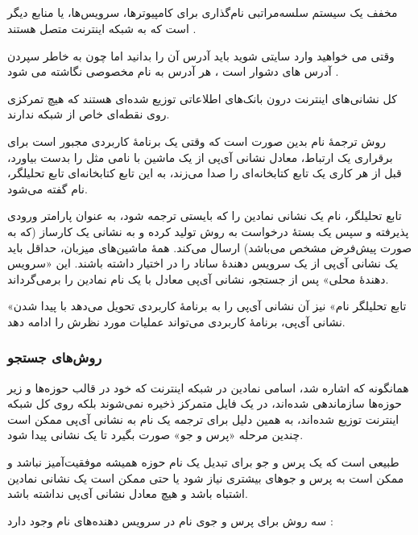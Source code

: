 \documentclass[12pt]{book}
\begin{document}
\subsection{}

مخفف
یک سیستم سلسه‌مراتبی نام‌گذاری برای کامپیوترها، سرویس‌ها، یا منابع دیگر است که به شبکه اینترنت متصل هستند .

وقتی می خواهید وارد سایتی شوید باید آدرس 
آن را بدانید اما چون به خاطر سپردن آدرس های 
دشوار است ، هر آدرس 
به نام مخصوصی نگاشته می شود .

کل نشانی‌های اینترنت درون بانک‌های اطلاعاتی توزیع شده‌ای هستند که هیچ تمرکزی روی نقطه‌ای خاص از شبکه ندارند. 

روش ترجمهٔ نام بدین صورت است که وقتی یک برنامهٔ کاربردی مجبور است برای برقراری یک ارتباط، معادل نشانی آی‌پی از یک ماشین با نامی مثل
 را بدست بیاورد، قبل از هر کاری یک تابع کتابخانه‌ای را صدا می‌زند، به این تابع کتابخانه‌ای تابع تحلیلگر، نام 
 گفته می‌شود. 
 
 تابع تحلیلگر، نام یک نشانی نمادین را که بایستی ترجمه شود، به عنوان پارامتر ورودی پذیرفته و سپس یک بستهٔ درخواست
  به روش
   تولید کرده و به نشانی یک کارساز
   (که به صورت پیش‌فرض مشخص می‌باشد) ارسال می‌کند. همهٔ ماشین‌های میزبان، حداقل باید یک نشانی آی‌پی از یک سرویس دهندهٔ ساناد را در اختیار داشته باشند. این «سرویس دهندهٔ محلی» پس از جستجو، نشانی آی‌پی معادل با یک نام نمادین را برمی‌گرداند.
   
«تابع تحلیلگر نام» نیز آن نشانی آی‌پی را به برنامهٔ کاربردی تحویل می‌دهد با پیدا شدن نشانی آی‌پی، برنامهٔ کاربردی می‌تواند عملیات مورد نظرش را ادامه دهد. 

\subsubsection{روش‌های جستجو}

همانگونه که اشاره شد، اسامی نمادین در شبکه اینترنت که خود در قالب حوزه‌ها و زیر حوزه‌ها سازماندهی شده‌اند، در یک فایل متمرکز ذخیره نمی‌شوند بلکه روی کل شبکه اینترنت توزیع شده‌اند، به همین دلیل برای ترجمه یک نام به نشانی آی‌پی ممکن است چندین مرحله «پرس و جو» صورت بگیرد تا یک نشانی پیدا شود.

طبیعی است که یک پرس و جو برای تبدیل یک نام حوزه همیشه موفقیت‌آمیز نباشد و ممکن است به پرس و جوهای بیشتری نیاز شود یا حتی ممکن است یک نشانی نمادین اشتباه باشد و هیچ معادل نشانی آی‌پی نداشته باشد.

سه روش برای پرس و جوی نام در سرویس دهنده‌های نام وجود دارد :
\end{document}
